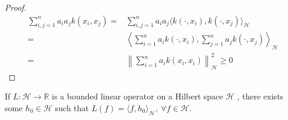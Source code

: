 \begin{proof}
    \begin{align}
        \sum\limits_{i,j=1}^n a_i a_j k(x_i, x_j)=& \sum\limits_{i,j=1}^n a_i a_j \langle k(\cdot, x_i), k(\cdot, x_j)\rangle_{\mathcal{H}}
        \\
        =& \left\langle \sum\limits_{i=1}^n a_i k(\cdot, x_i), \sum\limits_{j=1}^n a_j k(\cdot, x_j) \right\rangle_{\mathcal{H}} \\
        =& \left\| \sum\limits_{i=1}^n a_i k(x_i, x_i)\right\|_{\mathcal{H}}^2 \geq 0
    \end{align}
\end{proof}
   


\begin{theorem}
     If $L : \mathcal{H} \rightarrow \mathbb{R}$ is a bounded linear operator on a Hilbert space $\mathcal{H}$ , there exists some $h_0 \in \mathcal{H}$ such that $L(f) = \langle f,h_0\rangle_\mathcal{H}, \ \forall f \in \mathcal{H}$.
\end{theorem}

